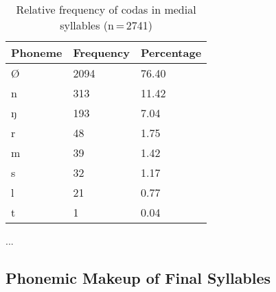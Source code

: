 \begin{table}[hp]\centering
\caption[Relative frequency of codas in medial syllables]{Relative frequency of codas in medial syllables (n\,=\,2741)}
\begin{tabu} to 0.5\textwidth{X X[c] X[c]}
\tableheaderfont\toprule
Phoneme
	& Frequency
	& Percentage
	\\
	
\toprule

Ø
	& 2094
	& 76.40\pct
	\\

\midrule

n
	& 313
	& 11.42\pct
	\\
ŋ
	& 193
	& 7.04\pct
	\\
r
	& 48
	& 1.75\pct
	\\
m
	& 39
	& 1.42\pct
	\\
s
	& 32
	& 1.17\pct
	\\
l
	& 21
	& 0.77\pct
	\\
t
	& 1
	& 0.04\pct
	\\

\bottomrule
\end{tabu}
\label{tab:midcod}
\end{table}

...

\subsection{Phonemic Makeup of Final Syllables}

